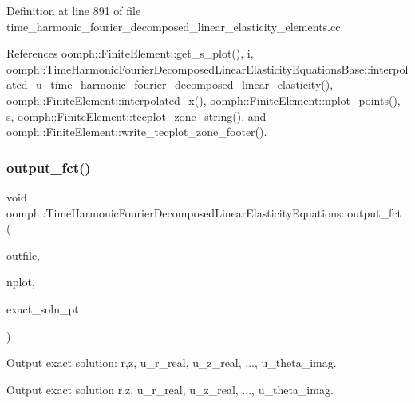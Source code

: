 Definition at line 891 of file time\+\_\+harmonic\+\_\+fourier\+\_\+decomposed\+\_\+linear\+\_\+elasticity\+\_\+elements.\+cc.



References oomph\+::\+Finite\+Element\+::get\+\_\+s\+\_\+plot(), i, oomph\+::\+Time\+Harmonic\+Fourier\+Decomposed\+Linear\+Elasticity\+Equations\+Base\+::interpolated\+\_\+u\+\_\+time\+\_\+harmonic\+\_\+fourier\+\_\+decomposed\+\_\+linear\+\_\+elasticity(), oomph\+::\+Finite\+Element\+::interpolated\+\_\+x(), oomph\+::\+Finite\+Element\+::nplot\+\_\+points(), s, oomph\+::\+Finite\+Element\+::tecplot\+\_\+zone\+\_\+string(), and oomph\+::\+Finite\+Element\+::write\+\_\+tecplot\+\_\+zone\+\_\+footer().

\mbox{\label{classoomph_1_1TimeHarmonicFourierDecomposedLinearElasticityEquations_a55bdbed4f99fe87124edba907acdf581}} 
\subsubsection{\texorpdfstring{output\+\_\+fct()}{output\_fct()}}
{\footnotesize\ttfamily void oomph\+::\+Time\+Harmonic\+Fourier\+Decomposed\+Linear\+Elasticity\+Equations\+::output\+\_\+fct (\begin{DoxyParamCaption}\item[{std\+::ostream \&}]{outfile,  }\item[{const unsigned \&}]{nplot,  }\item[{\hyperlink{classoomph_1_1FiniteElement_a690fd33af26cc3e84f39bba6d5a85202}{Finite\+Element\+::\+Steady\+Exact\+Solution\+Fct\+Pt}}]{exact\+\_\+soln\+\_\+pt }\end{DoxyParamCaption})\hspace{0.3cm}{\ttfamily [virtual]}}



Output exact solution\+: r,z, u\+\_\+r\+\_\+real, u\+\_\+z\+\_\+real, ..., u\+\_\+theta\+\_\+imag. 

Output exact solution r,z, u\+\_\+r\+\_\+real, u\+\_\+z\+\_\+real, ..., u\+\_\+theta\+\_\+imag. 

